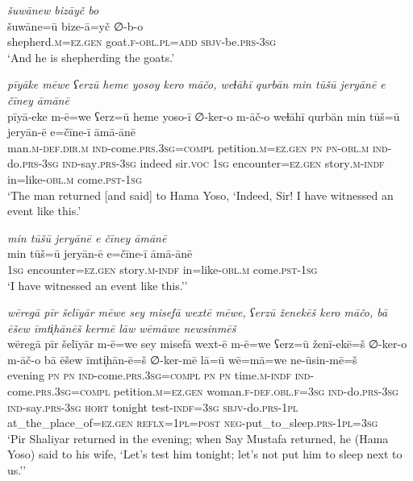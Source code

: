 \ea \label{ŽP.48}
\textit{šuwānew bizāyč bo} \\ 
\gll šuwāne=ū bize-ā=yč ∅-b-o \\ 
 shepherd\textsc{.m}\textsc{\textsc{=ez.gen}} goat\textsc{.f}\textsc{-obl}\textsc{.pl}\textsc{=add} \textsc{sbjv-}be\textsc{.prs}\textsc{-3sg} \\ 
\glt `And he is shepherding the goats.'
\z 
 
\ea \label{ŽP.57}
\textit{pīyāke mēwe ʕerzū heme yosoy kero māčo, weɫāhī qurbān min tūšū jeryānē e čīney āmānē} \\ 
\gll pīyā-eke m-ē=we ʕerz=ū heme yoso-ī ∅-ker-o m-āč-o weɫāhī qurbān min tūš=ū jeryān-ē e=čīne-ī āmā-ānē \\ 
 man\textsc{.m}\textsc{-def}\textsc{.dir}\textsc{.m} \textsc{ind-}come\textsc{.prs}\textsc{.3sg}\textsc{=compl} petition\textsc{.m}\textsc{\textsc{=ez.gen}} \textsc{pn} \textsc{pn}\textsc{-obl}\textsc{.m} \textsc{ind-}do\textsc{.prs}\textsc{-3sg} \textsc{ind-}say\textsc{.prs}\textsc{-3sg} indeed sir.\textsc{voc} \textsc{1sg} encounter\textsc{\textsc{=ez.gen}} story\textsc{.m}\textsc{-indf} in=like\textsc{-obl}\textsc{.m} come\textsc{.pst}\textsc{-\textsc{1sg}} \\ 
\glt `The man returned [and said] to Hama Yoso, ‘Indeed, Sir! I have witnessed an event like this.'
\z 
 
\ea \label{ŽP.58}
\textit{min tūšū jeryānē e čīney āmānē} \\ 
\gll min tūš=ū jeryān-ē e=čīne-ī āmā-ānē \\ 
 \textsc{1sg} encounter\textsc{\textsc{=ez.gen}} story\textsc{.m}\textsc{-indf} in=like\textsc{-obl}\textsc{.m} come\textsc{.pst}\textsc{-\textsc{1sg}} \\ 
\glt `I have witnessed an event like this.’'
\z 
 
\ea \label{ŽP.62}
\textit{wēregā pīr šelīyār mēwe sey misefā wextē mēwe, ʕerzū ženekēš kero māčo, bā ēšew īmti̩hānēš kermē lāw wēmāwe newsinmēš} \\ 
\gll wēregā pīr šelīyār m-ē=we sey misefā wext-ē m-ē=we ʕerz=ū ženī-ekē=š ∅-ker-o m-āč-o bā ēšew īmti̩hān-ē=š ∅-ker-mē lā=ū wē=mā=we ne-ūsin-mē=š \\ 
 evening \textsc{pn} \textsc{pn} \textsc{ind-}come\textsc{.prs}\textsc{.3sg}\textsc{=compl} \textsc{pn} \textsc{pn} time\textsc{.m}\textsc{-indf} \textsc{ind-}come\textsc{.prs}\textsc{.3sg}\textsc{=compl} petition\textsc{.m}\textsc{\textsc{=ez.gen}} woman\textsc{.f}\textsc{-def}\textsc{.obl}\textsc{.f}\textsc{=3sg} \textsc{ind-}do\textsc{.prs}\textsc{-3sg} \textsc{ind-}say\textsc{.prs}\textsc{-3sg} \textsc{hort} tonight test\textsc{-indf}\textsc{=3sg} \textsc{sbjv-}do\textsc{.prs}\textsc{-1pl} at\_the\_place\_of\textsc{\textsc{=ez.gen}} \textsc{reflx}\textsc{=1pl}\textsc{=\textsc{post}} \textsc{neg-}put\_to\_sleep\textsc{.prs}\textsc{-1pl}\textsc{=3sg} \\ 
\glt `Pir Shaliyar returned in the evening; when Say Mustafa returned, he (Hama Yoso) said to his wife, ‘Let’s test him tonight; let’s not put him to sleep next to us.’'
\z 
 
